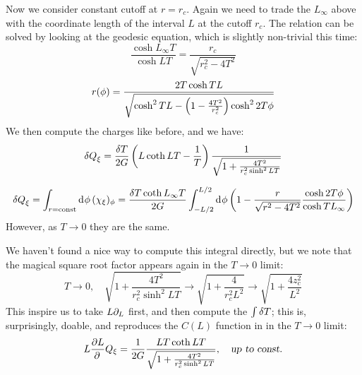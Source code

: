 \documentclass[11pt,a4paper,utf8]{article}
\begin{document}
	Now we consider constant cutoff at $r = r_c$. Again we need to trade the $L_\infty$ above with the coordinate length of the interval $L$ at the cutoff $r_c$. The relation can be solved by looking at the geodesic equation, which is slightly non-trivial this time:
	\begin{equation}
		\frac{\cosh L_\infty T}{\cosh LT}
		= \frac{r_c}{\sqrt{r_c^2 - 4T^2}}
	\end{equation}
	\begin{equation}
		r(\phi) = \frac{2T\cosh TL}{
				\sqrt{\cosh^2 TL - \left(
					1 - \frac{4T^2}{r_c^2}
				\right)\cosh^2 2T\phi}
			}
	\end{equation}
	We then compute the charges like before, and we have:
	\begin{equation}
		\mathinner{\delta Q}_\xi
		= \frac{\mathinner{\delta T}}{2G} \left(
				L \coth LT - \frac{1}{T}
			\right)
			\frac{1}{\sqrt{
				1 + \frac{4T^2}{r_c^2 \sinh^2 LT}
			}}
	\end{equation}
	
	\begin{equation}
		\mathinner{\delta Q}_\xi
		= \int_{r = \mathrm{const}} \mathinner{\mathrm{d}^{}\phi} (\chi_\xi)_\phi
		= \frac{\mathinner{\delta T} \coth L_\infty T}{2G}
			\int_{-L/2}^{L/2} \mathinner{\mathrm{d}^{}\phi}
			\left(
				1 - {\frac{r}{\sqrt{r^2 - 4T^2}}}
				\frac{\cosh 2T\phi}{\cosh TL_\infty}
			\right)
	\end{equation}
	 However, as $T\to 0$ they are the same. 
	
	
	We haven't found a nice way to compute this integral directly, but we note that the magical square root factor appears again in the $T\to 0$ limit:
	\begin{equation}
		T\to 0,
	\quad
		\sqrt{
			1 + \frac{4T^2}{r_c^2 \sinh^2 LT}
		}
		\to \sqrt{
			1 + \frac{4}{r_c^2 L^2}
		}
		\to \sqrt{
			1 + \frac{4z_c^2}{L^2}
		}
	\end{equation}
	This inspire us to take $L\partial_{L}$ first, and then compute the $\int \mathinner{\delta T}$; this is, surprisingly, doable, and reproduces the $C(L)$ function in \textcite{Lewkowycz:2019xse} in the $T \to 0$ limit:
	\begin{equation}
		L \frac{\partial{L}}{\partial{\,}}Q_\xi
		= \frac{1}{2G}
			\frac{LT \coth LT}{\sqrt{
				1 + \frac{4T^2}{r_c^2 \sinh^2 LT}
			}},
	\quad\textsl{up to const.}
	\end{equation}
	
\end{document}
